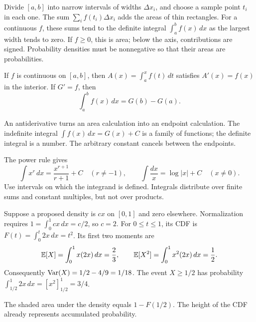 Divide $[a,b]$ into narrow intervals of widths $\Delta x_i$, and choose
a sample point $t_i$ in each one. The sum
$\sum_i f(t_i)\Delta x_i$ adds the areas of thin rectangles.
For a continuous $f$, these sums tend to the definite integral
$\int_a^b f(x)\,dx$ as the largest width tends to zero.
If $f\ge0$, this is area; below the axis, contributions are signed.
Probability densities must be nonnegative so that their areas are probabilities.

\begin{theorem}
If $f$ is continuous on $[a,b]$, then
$A(x)=\int_a^x f(t)\,dt$ satisfies $A'(x)=f(x)$ in the interior.
If $G'=f$, then
\[
 \int_a^b f(x)\,dx=G(b)-G(a).
\]
\end{theorem}
An antiderivative turns an area calculation into an endpoint calculation.
The indefinite integral $\int f(x)\,dx=G(x)+C$ is a family of functions;
the definite integral is a number. The arbitrary constant cancels between
the endpoints.

The power rule gives
\[
 \int x^r\,dx=\frac{x^{r+1}}{r+1}+C\quad(r\ne-1),\qquad
 \int\frac{dx}{x}=\log|x|+C\quad(x\ne0).
\]
Use intervals on which the integrand is defined. Integrals distribute over
finite sums and constant multiples, but not over products.

\begin{example}
Suppose a proposed density is $cx$ on $[0,1]$ and zero elsewhere.
Normalization requires $1=\int_0^1 cx\,dx=c/2$, so $c=2$.
For $0\le t\le1$, its CDF is
$F(t)=\int_0^t2x\,dx=t^2$. Its first two moments are
\[
 \mathbb E[X]=\int_0^1 x(2x)\,dx=\frac23,\qquad
 \mathbb E[X^2]=\int_0^1 x^2(2x)\,dx=\frac12.
\]
Consequently $\operatorname{Var}(X)=1/2-4/9=1/18$.
The event $X\ge1/2$ has probability
$\int_{1/2}^1 2x\,dx=[x^2]_{1/2}^1=3/4$.
\end{example}

\begin{center}
\end{center}
The shaded area under the density equals $1-F(1/2)$.
The height of the CDF already represents accumulated probability.

